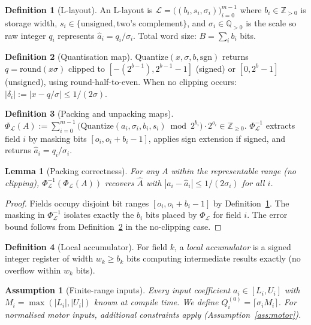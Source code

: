 \documentclass[11pt,a4paper]{article}
\theoremstyle{definition}
\newtheorem{definition}{Definition}[section]
\theoremstyle{plain}
\newtheorem{lemma}{Lemma}[section]
\newtheorem{assumption}{Assumption}[section]
\theoremstyle{remark}
\newcommand{\Quantize}{\mathrm{Quantize}}
\newcommand{\Pack}{\Phi_{\mathcal{L}}}
\newcommand{\Unpack}{\Phi^{-1}_{\mathcal{L}}}
\begin{document}
\begin{definition}[L-layout]
\label{def:layout}
An L-layout is $\mathcal{L}=\bigl((b_i,s_i,\sigma_i)\bigr)_{i=0}^{m-1}$
where $b_i\in\mathbb{Z}_{>0}$ is storage width, $s_i\in\{\text{unsigned},
\text{two's complement}\}$, and $\sigma_i\in\mathbb{Q}_{>0}$ is the scale
so raw integer $q_i$ represents $\hat{a}_i=q_i/\sigma_i$.
Total word size: $B=\sum_i b_i$ bits.
\end{definition}

\begin{definition}[Quantisation map]
\label{def:quantize}
$\Quantize(x,\sigma,b,\mathrm{sgn})$ returns
$q=\mathrm{round}(x\sigma)$ clipped to $[-(2^{b-1}),2^{b-1}-1]$ (signed)
or $[0,2^b-1]$ (unsigned), using round-half-to-even.
When no clipping occurs: $|\delta_i|:=|x-q/\sigma|\le1/(2\sigma)$.
\end{definition}

\begin{definition}[Packing and unpacking maps]
\label{def:pack}
$\Pack(A):=\sum_{i=0}^{m-1}\bigl(\Quantize(a_i,\sigma_i,b_i,s_i)\bmod2^{b_i}\bigr)
\cdot2^{o_i}\in\mathbb{Z}_{\ge0}.$
$\Unpack$ extracts field $i$ by masking bits $[o_i,o_i+b_i-1]$, applies
sign extension if signed, and returns $\hat{a}_i=q_i/\sigma_i$.
\end{definition}

\begin{lemma}[Packing correctness]
\label{lem:pack}
For any $A$ within the representable range (no clipping),
$\Unpack(\Pack(A))$ recovers $\hat{A}$ with
$|a_i-\hat{a}_i|\le1/(2\sigma_i)$ for all $i$.
\end{lemma}
\begin{proof}
Fields occupy disjoint bit ranges $[o_i,o_i+b_i-1]$ by
Definition~\ref{def:layout}.
The masking in $\Unpack$ isolates exactly the $b_i$ bits placed by $\Pack$
for field $i$.
The error bound follows from Definition~\ref{def:quantize} in the no-clipping
case.
\end{proof}

\begin{definition}[Local accumulator]
\label{def:accum}
For field $k$, a \emph{local accumulator} is a signed integer register of
width $w_k\ge b_k$ bits computing intermediate results exactly
(no overflow within $w_k$ bits).
\end{definition}

\begin{assumption}[Finite-range inputs]
\label{ass:range}
Every input coefficient $a_i\in[L_i,U_i]$ with $M_i=\max(|L_i|,|U_i|)$
known at compile time.
We define $Q_i^{(0)}=\lceil\sigma_iM_i\rceil$.
For normalised motor inputs, additional constraints apply (Assumption~\ref{ass:motor}).
\end{assumption}
\end{document}
